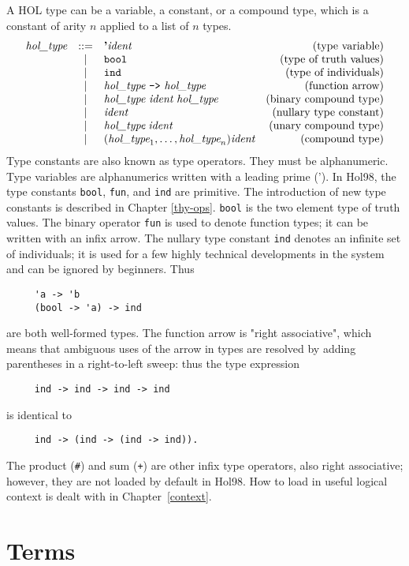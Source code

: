 \documentclass[12pt,fleqn,a4paper]{report}
\newcommand{\ident}      {\mbox{\it ident}}
\newcommand{\type}       {\mbox{\it hol\_type}}
\begin{document}
A HOL type can be a variable, a constant, or a compound type, which is
a constant of arity $n$ applied to a list of $n$ types.
\[
\begin{array}{rclr}
  \type & ::= & \mbox{\bf '}\ident & \mbox{(type variable)} \\
  & | &  \verb+bool+ & \mbox{(type of truth values)} \\
  & | &  \verb+ind+ & \mbox{(type of individuals)} \\
  & | &  \type\ \verb+->+\ \type & \mbox{(function arrow)} \\
  & | &  \type\ \ident\ \type\ & \mbox{(binary compound type)}\\
  & | &  \ident & \mbox{(nullary type constant)} \\
  & | & \type\; \ident & \mbox{(unary compound type)} \\
  & | & (\type_1,\ldots,\type_n) \ident & \mbox{(compound type)}
\end{array}
\]
Type constants are also known as type operators. They must be
alphanumeric. Type variables are alphanumerics written with a leading
prime ('). In Hol98, the type constants {\tt bool}, {\tt fun}, and
{\tt ind} are primitive. The introduction of new type constants is
described in Chapter \ref{thy-ops}. {\tt bool} is the two element type
of truth values. The binary operator {\tt fun} is used to denote
function types; it can be written with an infix arrow. The nullary
type constant {\tt ind} denotes an infinite set of individuals; it is
used for a few highly technical developments in the system and can be
ignored by beginners.  Thus
\begin{verbatim}
     'a -> 'b
     (bool -> 'a) -> ind
\end{verbatim}
are both well-formed types. The function arrow is "right associative",
which means that ambiguous uses of the arrow in types are resolved by
adding parentheses in a right-to-left sweep: thus the type expression
\begin{verbatim}
     ind -> ind -> ind -> ind
\end{verbatim}
is identical to
\begin{verbatim}
     ind -> (ind -> (ind -> ind)).
\end{verbatim}
The product (\verb+#+) and sum (\verb!+!) are other infix type
operators, also right associative; however, they are not loaded by
default in Hol98. How to load in useful logical context is dealt with
in Chapter~\ref{context}.

\section{Terms}
\end{document}
